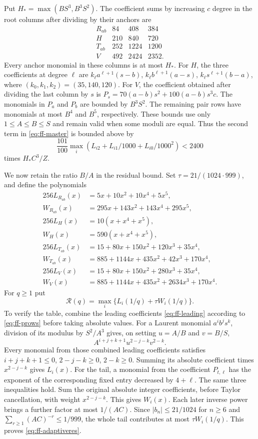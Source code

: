 \documentclass[12pt]{article}
\numberwithin{equation}{section}
\begin{document}
Put $H_* =\max(BS^3,B^3S^2)$. The coefficient sums by increasing
$c$ degree in the root columns after dividing by their anchors are
\begin{equation}\label{eq:ff-pdegrees}
 \begin{array}{c|rrr}
  R_{ab}&84&408&384\\
  H&210&840&720\\
  T_{ab}&252&1224&1200\\
  V&492&2424&2352.
 \end{array}
\end{equation}
Every anchor monomial in these columns is at most $H_*$.
For $H$, the three coefficients at degree $\ell$ are
$k_\ell a^{\ell+1}(s-b)$,
$k_\ell b^{\ell+1}(a-s)$,
$k_\ell s^{\ell+1}(b-a)$, where $(k_0,k_1,k_2)=(35,140,120)$.
For $V$, the coefficient obtained after dividing the last column by $s$ is
$P_s=70(a-b)s^2+100(a-b)s^3c$. The monomials in $P_a$ and $P_b$
are bounded by $B^3S^2$.
The remaining pair rows have monomials at most $B^4$ and $B^5$,
respectively. These bounds use only $1\le A\le B\le S$ and remain valid when some moduli are equal.
Thus the second term in \eqref{eq:ff-master} is bounded above by
\[
 \frac{101}{100}\max_i(L_{i2}+L_{i1}/1000+L_{i0}/1000^2)<2400
\]
times $H_*C^3/Z$.

We now retain the ratio $B/A$ in the residual bound.
Set $\tau=21/(1024\cdot999)$, and define the polynomials
\[
\begin{aligned}
 256L_{R_{ab}}(x)&=5x+10x^2+10x^4+5x^5,\\
 W_{R_{ab}}(x)&=295x+143x^2+143x^4+295x^5,\\
 256L_H(x)&=10(x+x^4+x^5),\\
 W_H(x)&=590(x+x^4+x^5),\\
 256L_{T_{ab}}(x)&=15+80x+150x^2+120x^3+35x^4,\\
 W_{T_{ab}}(x)&=885+1144x+435x^2+42x^3+170x^4,\\
 256L_V(x)&=15+80x+150x^2+280x^3+35x^4,\\
 W_V(x)&=885+1144x+435x^2+2634x^3+170x^4.
\end{aligned}
\]
For $q\ge1$ put
\begin{equation}\label{eq:ff-adaptiveres}
 \mathcal R(q)=\max_i\{L_i(1/q)+\tau W_i(1/q)\}.
\end{equation}
To verify the table, combine the leading coefficients
\eqref{eq:ff-leading} according to \eqref{eq:ff-prows} before taking
absolute values. For a Laurent monomial $a^ib^js^k$, division of its
modulus by $S^2/A^3$ gives, on setting $u=A/B$ and $v=B/S$,
\[
 A^{i+j+k+1}u^{2-j-k}v^{2-k}.
\]
Every monomial from those combined leading coefficients satisfies
$i+j+k+1\le0$, $2-j-k\ge0$, $2-k\ge0$.
Summing its absolute coefficient times $x^{2-j-k}$ gives $L_i(x)$.
For the tail, a monomial from the coefficient $P_{t,\ell}$ has the exponent of the corresponding fixed entry decreased by $4+\ell$. The same three inequalities
hold. Sum the original absolute integer coefficients, before Taylor
cancellation, with weight $x^{2-j-k}$. This gives $W_i(x)$.
Each later inverse power brings a further factor at most $1/(AC)$.
Since $|b_n|\le21/1024$ for $n\ge6$ and
$\sum_{r\ge1}(AC)^{-r}\le1/999$, the whole tail contributes at most
$\tau W_i(1/q)$. This proves \eqref{eq:ff-adaptiveres}.
\end{document}
